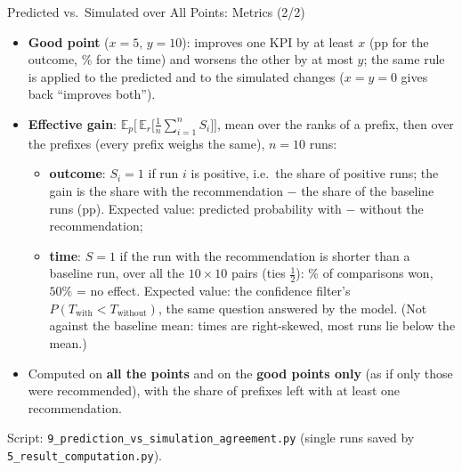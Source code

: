 \documentclass[aspectratio=169]{beamer} %
\begin{document}
\begin{frame}{Predicted vs.\ Simulated over All Points: Metrics (2/2)}
  \footnotesize
  \begin{itemize}
    \item \textbf{Good point} ($x = 5$, $y = 10$): improves one KPI by at least $x$ (pp for the outcome, \% for the
      time) and worsens the other by at most $y$; the same rule is applied to the predicted and to the simulated
      changes ($x = y = 0$ gives back ``improves both'').
    \item \textbf{Effective gain}: $\mathbb{E}_p\big[\,\mathbb{E}_r\big[\tfrac{1}{n}\sum_{i=1}^{n} S_i\big]\big]$, mean
      over the ranks of a prefix, then over the prefixes (every prefix weighs the same), $n = 10$ runs:
      \begin{itemize}\footnotesize
        \item \textbf{outcome}: $S_i = 1$ if run $i$ is positive, i.e.\ the share of positive runs; the gain is the
          share with the recommendation $-$ the share of the baseline runs (pp). Expected value: predicted
          probability with $-$ without the recommendation;
        \item \textbf{time}: $S = 1$ if the run with the recommendation is shorter than a baseline run, over all the
          $10 \times 10$ pairs (ties $\tfrac12$): \% of comparisons won, $50\%$ = no effect. Expected value: the
          confidence filter's $P(T_{\text{with}} < T_{\text{without}})$, the same question answered by the model.
          (Not against the baseline mean: times are right-skewed, most runs lie below the mean.)
      \end{itemize}
    \item Computed on \textbf{all the points} and on the \textbf{good points only} (as if only those were
      recommended), with the share of prefixes left with at least one recommendation.
  \end{itemize}
  {\scriptsize Script: \texttt{9\_prediction\_vs\_simulation\_agreement.py} (single runs saved by \texttt{5\_result\_computation.py}).}
\end{frame}
\end{document}
